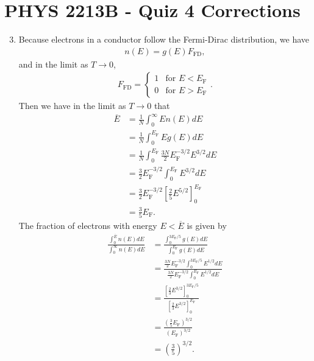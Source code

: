 \documentclass[a4paper,12pt]{article}
\begin{document}
\section*{PHYS 2213B - Quiz 4 Corrections}

\begin{enumerate}
    \setcounter{enumi}{2}
    \item
        Because electrons in a conductor follow the Fermi-Dirac distribution, we have
        \begin{align}
            n(E) = g(E) F_{\text{FD}},
        \end{align}
        and in the limit as $T \to 0$,
        \begin{align}
            F_{\text{FD}} = \begin{cases}
                1 & \text{for } E < E_\text{F} \\
                0 & \text{for } E > E_\text{F}
            \end{cases}.
        \end{align}
        Then we have in the limit as $T \to 0$ that
        \begin{align*}
            \overline{E} &= \frac{1}{N} \int_0^\infty E n(E) dE \\
            &= \frac{1}{N} \int_0^{E_\text{F}} E g(E) dE \\
            &= \frac{1}{N} \int_0^{E_\text{F}} \frac{3N}{2} E_\text{F}^{-3/2} E^{3/2} dE \\
            &= \frac{3}{2} E_\text{F}^{-3/2} \int_0^{E_\text{F}} E^{3/2} dE \\
            &= \frac{3}{2} E_\text{F}^{-3/2} \left[ \frac{2}{5} E^{5/2} \right]_0^{E_\text{F}} \\
            &= \frac{3}{5} E_\text{F}.
        \end{align*}
        The fraction of electrons with energy $E < \overline{E}$ is given by
        \begin{align*}
            \frac{\int_0^{\overline{E}} n(E) dE}{\int_0^\infty n(E) dE} &= \frac{\int_0^{3E_\text{F}/5} g(E) dE}{\int_0^{E_\text{F}} g(E) dE} \\
            &= \frac{\frac{3N}{2} E_\text{F}^{-3/2} \int_0^{3E_\text{F}/5} E^{1/2} dE}{\frac{3N}{2} E_\text{F}^{-3/2} \int_0^{E_\text{F}} E^{1/2} dE} \\
            &= \frac{\left[ \frac{2}{3} E^{3/2} \right]_0^{3E_\text{F}/5}}{\left[ \frac{2}{3} E^{3/2} \right]_0^{E_\text{F}}} \\
            &= \frac{\left( \frac{3}{5} E_\text{F} \right)^{3/2}}{\left( E_\text{F} \right)^{3/2}} \\
            &= \left( \frac{3}{5} \right)^{3/2}.
        \end{align*}

\end{enumerate}
\end{document}
